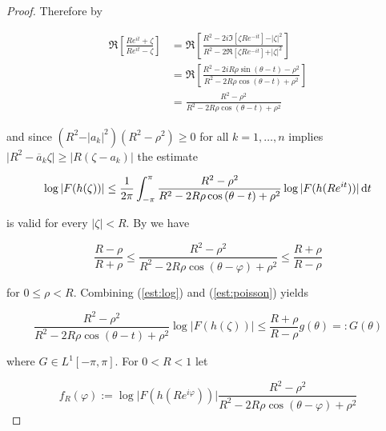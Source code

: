 \begin{proof}
	Therefore by

	\begin{equation*}
		\begin{aligned}
			\Re \left[\frac{R e^{it} + \zeta}{R e^{it} - \zeta}\right] &= \Re \left[\frac{R^2 - 2i \Im \left[ \zeta R e^{-it} \right] - \vert \zeta \vert^2}{R^2 - 2\Re \left[ \zeta R e^{-it} \right] + \vert \zeta \vert^2}\right]\\ &= \Re \left[\frac{R^2 - 2iR\rho \sin\left( \theta - t \right) - \rho^2 }{R^2 - 2R\rho \cos\left( \theta - t \right) + \rho^2}\right]\\
			&= \frac{R^2 - \rho^2}{R^2 - 2R\rho \cos\left( \theta - t \right) + \rho^2}
		\end{aligned}
	\end{equation*}

	\noindent and since $\left( R^2 - \vert a_k \vert^2 \right)\left( R^2 - \rho^2 \right)\geq 0$ for all $k = 1,\dots,n$ implies $\vert R^2 - \overline{a}_k\zeta \vert \geq \vert R\left( \zeta - a_k\right)\vert$ the estimate 

	\begin{equation}
		\log\vert F(h(\zeta))\vert \leq \frac{1}{2\pi}\int_{-\pi}^\pi \frac{R^2 - \rho^2}{R^2 - 2R\rho \cos\left( \theta - t \right) + \rho^2}\log\vert F(h(R e^{it}))\vert\mathop{}\!\mathrm{d} t
	\end{equation}

	\noindent is valid for every $\vert \zeta \vert < R$. By \cite[236]{rudin:rc_analysis:1987} we have

	\begin{equation}
		\frac{R - \rho}{R + \rho} \leq \frac{R^2 - \rho^2}{R^2 - 2R\rho\cos(\theta - \varphi) + \rho^2} \leq \frac{R + \rho}{R - \rho}
		\label{est:poisson}
	\end{equation}
	
	\noindent for $0 \leq \rho < R$. Combining (\ref{est:log}) and (\ref{est:poisson}) yields 

\begin{equation}
	\frac{R^2 - \rho^2}{R^2 - 2R\rho \cos\left( \theta - t \right) + \rho^2}\log\vert F(h(\zeta))\vert \leq \frac{R + \rho}{R - \rho}g\left( \theta \right) =: G\left( \theta \right)
\end{equation}

\noindent where $G \in L^1[-\pi,\pi]$. For $0 < R < 1$ let

\begin{equation*}
	f_R(\varphi) := \log\vert F(h(Re^{i\varphi}))\vert \frac{R^2 - \rho^2}{R^2 - 2R\rho\cos(\theta - \varphi) + \rho^2}
\end{equation*}


\end{proof}
